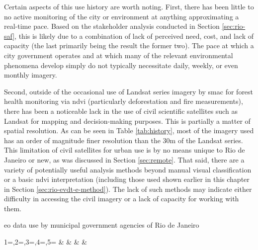 Certain aspects of this use history are worth noting. First, there has been little to no active monitoring of the city or environment at anything approximating a real-time pace. Based on the stakeholder analysis conducted in Section \ref{sec:rio-saf}, this is likely due to a combination of lack of perceived need, cost, and lack of capacity (the last primarily being the result the former two). The pace at which a city government operates and at which many of the relevant environmental phenomena develop simply do not typically necessitate daily, weekly, or even monthly imagery.

Second, outside of the occasional use of Landsat series imagery by \ac{smac} for forest health monitoring via \ac{ndvi} (particularly deforestation and fire measurements), there has been a noticeable lack in the use of civil scientific satellites such as Landsat for mapping and decision-making purposes. This is partially a matter of spatial resolution. As can be seen in Table \ref{tab:history}, most of the imagery used has an order of magnitude finer resolution than the 30m of the Landsat series. This limitation of civil satellites for urban use is by no means unique to Rio de Janeiro or new, as was discussed in Section \ref{sec:remote}. That said, there are a variety of potentially useful analysis methods beyond manual visual classification or a basic \ac{ndvi} interpretation (including those used shown earlier in this chapter in Section \ref{sec:rio-evdt-e-method}). The lack of such methods may indicate either difficulty in accessing the civil imagery or a lack of capacity for working with them.

\begin{table}[!htb]\centering
	\caption[EO data use by Rio de Janeiro]{\ac{eo} data use by municipal government agencies of Rio de Janeiro}\label{tab:history}
	\fontsize{8}{10}\selectfont
		{1=\year,2=\type,3=\platform,4=\agency,5=\primary}
		{\year & \type & \platform & \agency & \primary}
\end{table}


\section{} \label{sec:rio-dss}

